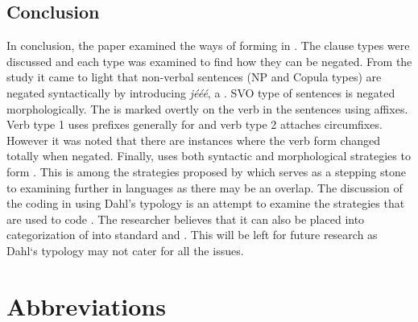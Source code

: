 \documentclass[output=paper
,newtxmath
,modfonts
,nonflat]{langsci/langscibook}
\begin{document}
\subsection{\label{sec:ollennu:3.1} Conclusion}

In conclusion, the paper examined the ways of forming  in . The clause types were discussed and each type was examined to find how they can be negated. From the study it came to light that non-verbal sentences (NP and Copula types) are negated syntactically by introducing \textit{j\'e\'e\'e}, a . SVO type of sentences is negated morphologically. The  is marked overtly on the verb in the sentences using affixes. Verb type 1 uses prefixes generally for  and verb type 2 attaches circumfixes. However it was noted that there are instances where the verb form changed totally when negated. Finally,  uses both syntactic and morphological strategies to form . This is among the strategies proposed by \citet{dahl1979typology} which serves as a stepping stone to examining  further in  languages as there may be an overlap. The discussion of the  coding in  using Dahl’s typology is an attempt to examine the strategies that are used to code . The researcher believes that it can also be placed into \citet{Miestamo2007} categorization of  into standard and . This will be left for future research as Dahl‘s typology may not cater for all the issues.

\section*{Abbreviations}
\end{document}
